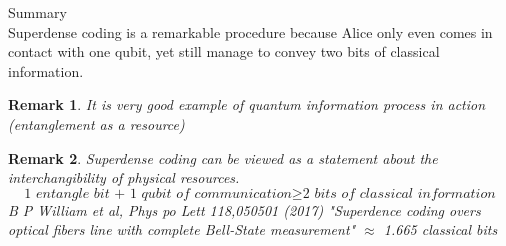 \documentclass[]{book}
\newtheorem*{remark}{Remark}
\theoremstyle{nonumberplain}
\begin{document}
Summary \\
Superdense coding is a remarkable procedure because Alice only even comes in contact with one qubit, yet still manage to convey two bits of classical information. 
\begin{remark}
	It is very good example of quantum information process in action (entanglement as a resource)
\end{remark}
\begin{remark}
Superdense coding can be viewed as a statement about the interchangibility of physical resources.
\[
	\textit{1 entangle bit + 1 qubit of communication} \geq \textit{2 bits of classical information}
\] 
\textit{B P William et al, Phys po Lett 118,050501 (2017)}
"Superdence coding overs optical fibers line with complete Bell-State measurement" $\approx$ 1.665 classical bits
\end{remark}
\ \\
\end{document}
